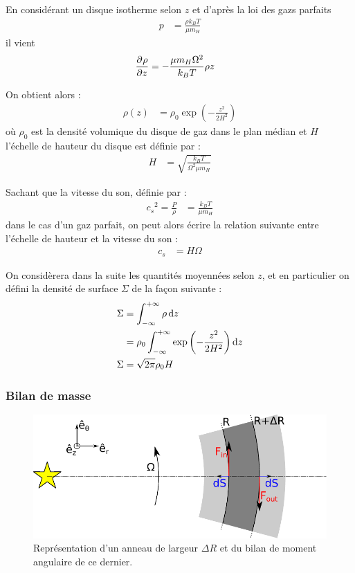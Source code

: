 En considérant un disque isotherme selon $z$ et d'après la loi des gazs parfaits
\begin{align}
p &= \frac{\rho k_B T}{\mu m_H}
\end{align}
il vient
\begin{align}
\mathinner{ \dfrac{\partial{^{}}\rho}{\partial{{z}^{}}} } &= -\frac{\mu m_H\Omega^2}{k_B T}\rho z
\end{align}

On obtient alors :
\begin{align}
\rho(z) &= \rho_0\exp\left(-\frac{z^2}{2H^2}\right)
\end{align}
où $\rho_0$ est la densité volumique du disque de gaz dans le plan médian et $H$ l'échelle de hauteur du disque est définie par : 
\begin{align}
H &= \sqrt{\frac{k_B T}{\Omega^2 \mu m_H}}
\end{align}

\bigskip

Sachant que la vitesse du son, définie par :
\begin{align}
{c_s}^2=\frac{P}{\rho} &= \frac{k_B T}{\mu m_H}
\end{align}
dans le cas d'un gaz parfait, on peut alors écrire la relation suivante entre l'échelle de hauteur et la vitesse du son : 
\begin{align}
c_s &= H\Omega
\end{align}

\bigskip

On considèrera dans la suite les quantités moyennées selon $z$, et en particulier on défini la densité de surface $\Sigma$ de la façon suivante : 
\begin{align}
\Sigma &= \int_{-\infty}^{+\infty} \rho \dif z\nonumber\\
&=\rho_0 \int_{-\infty}^{+\infty}  \exp\left(-\frac{z^2}{2H^2}\right)\dif z\nonumber\\
\Sigma &= \sqrt{2\pi}\rho_0 H
\end{align}


\subsubsection{Bilan de masse}
\begin{figure}[htb]
\centering
\includegraphics[width=0.7\linewidth]{figure/disk_ring.pdf}
\caption{Représentation d'un anneau de largeur $\Delta R$ et du bilan de moment angulaire de ce dernier.}\label{fig:disk_ring}
\end{figure}

